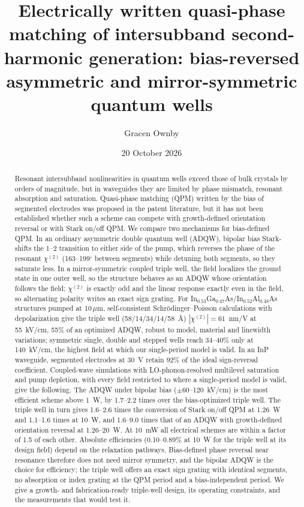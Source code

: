 \documentclass[11pt]{article}
\title{Electrically written quasi-phase matching of intersubband second-harmonic generation: bias-reversed asymmetric and mirror-symmetric quantum wells}
\author{Gracen Ownby}
\affil{University of Oklahoma, Norman, Oklahoma, USA}
\date{\small 20 October 2026}
\newcommand{\chitwo}{\chi^{(2)}}
\newcommand{\um}{\,\mu\mathrm{m}}
\begin{document}
\maketitle

\begin{abstract}
Resonant intersubband nonlinearities in quantum wells exceed those of bulk crystals by orders of magnitude, but in waveguides they are limited by phase mismatch, resonant absorption and saturation. Quasi-phase matching (QPM) written by the bias of segmented electrodes was proposed in the patent literature, but it has not been established whether such a scheme can compete with growth-defined orientation reversal or with Stark on/off QPM. We compare two mechanisms for bias-defined QPM. In an ordinary asymmetric double quantum well (ADQW), bipolar bias Stark-shifts the 1--2 transition to either side of the pump, which reverses the phase of the resonant $\chitwo$ (163--199$^\circ$ between segments) while detuning both segments, so they saturate less. In a mirror-symmetric coupled triple well, the field localizes the ground state in one outer well, so the structure behaves as an ADQW whose orientation follows the field; $\chitwo$ is exactly odd and the linear response exactly even in the field, so alternating polarity writes an exact sign grating. For In$_{0.53}$Ga$_{0.47}$As/In$_{0.52}$Al$_{0.48}$As structures pumped at 10$\um$, self-consistent Schr\"odinger--Poisson calculations with depolarization give the triple well (58/14/34/14/58~\AA) $|\chitwo|=61$~nm/V at 55~kV/cm, 55\% of an optimized ADQW, robust to model, material and linewidth variations; symmetric single, double and stepped wells reach 34--40\% only at 140~kV/cm, the highest field at which our single-period model is valid. In an InP waveguide, segmented electrodes at 30~V retain 92\% of the ideal sign-reversal coefficient. Coupled-wave simulations with LO-phonon-resolved multilevel saturation and pump depletion, with every field restricted to where a single-period model is valid, give the following. The ADQW under bipolar bias ($\pm60$--120~kV/cm) is the most efficient scheme above 1~W, by 1.7--2.2 times over the bias-optimized triple well. The triple well in turn gives 1.6--2.6 times the conversion of Stark on/off QPM at 1.26~W and 1.1--1.6 times at 10~W, and 1.6--9.0 times that of an ADQW with growth-defined orientation reversal at 1.26--20~W. At 10~mW all electrical schemes are within a factor of 1.5 of each other. Absolute efficiencies (0.10--0.89\% at 10~W for the triple well at its design field) depend on the relaxation pathways. Bias-defined phase reversal near resonance therefore does not need mirror symmetry, and the bipolar ADQW is the choice for efficiency; the triple well offers an exact sign grating with identical segments, no absorption or index grating at the QPM period and a bias-independent period. We give a growth- and fabrication-ready triple-well design, its operating constraints, and the measurements that would test it.
\end{abstract}
\end{document}
